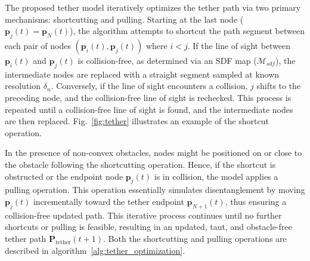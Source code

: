 The proposed tether model iteratively optimizes the tether path via two primary mechanisms: shortcutting and pulling. %
Starting at the last node ($\mathbf{p}_j(t) = \mathbf{p}_{N}(t)$), the algorithm attempts to shortcut the path segment between each pair of nodes \( (\mathbf{p}_i(t), \mathbf{p}_j(t)) \) where \( i < j \).
If the line of sight between \( \mathbf{p}_i(t) \) and \( \mathbf{p}_j(t) \) is collision-free, as determined via an \ac{SDF} map (\( \mathcal{M}_{sdf} \)), the intermediate nodes are replaced with a straight segment sampled at known resolution \( \delta_n \). Conversely, if the line of sight encounters a collision, $j$ shifts to the preceding node, and the collision-free line of sight is rechecked. This process is repeated until a collision-free line of sight is found, and the intermediate nodes are then replaced. Fig.~\ref{fig:tether} illustrates an example of the shortcut operation. 

In the presence of non-convex obstacles, nodes might be positioned on or close to the obstacle following the shortcutting operation. Hence, if the shortcut is obstructed or the endpoint node \( \mathbf{p}_j(t) \) is in collision, the model applies a pulling operation. This operation essentially simulates disentanglement by moving \( \mathbf{p}_j(t) \) incrementally toward the tether endpoint \( \mathbf{p}_{N+1}(t) \), thus ensuring a collision-free updated path. This iterative process continues until no further shortcuts or pulling is feasible, resulting in an updated, taut, and obstacle-free tether path \( \mathbf{P}_{\mathrm{tether}}(t+1) \). Both the shortcutting and pulling operations are described in algorithm~\ref{alg:tether_optimization}.





